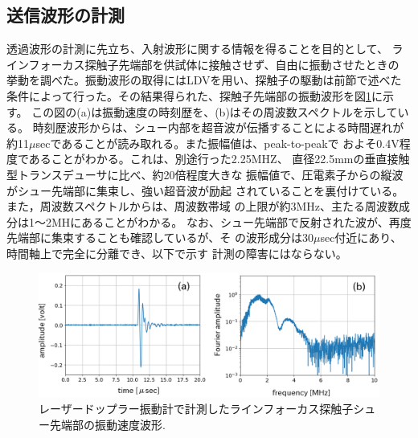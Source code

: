 \subsection{送信波形の計測}
透過波形の計測に先立ち、入射波形に関する情報を得ることを目的として、
ラインフォーカス探触子先端部を供試体に接触させず、自由に振動させたときの
挙動を調べた。振動波形の取得にはLDVを用い、探触子の駆動は前節で述べた
条件によって行った。その結果得られた、探触子先端部の振動波形を図\ref{fig:fig5}に示す。
この図の(a)は振動速度の時刻歴を、(b)はその周波数スペクトルを示している。
時刻歴波形からは、シュー内部を超音波が伝播することによる時間遅れが
約11$\mu$secであることが読み取れる。また振幅値は、peak-to-peakで
およそ0.4V程度であることがわかる。これは、別途行った2.25MHZ、
直径22.5mmの垂直接触型トランスデューサに比べ、約20倍程度大きな
振幅値で、圧電素子からの縦波がシュー先端部に集束し、強い超音波が励起
されていることを裏付けている。また，周波数スペクトルからは、周波数帯域
の上限が約3MHz、主たる周波数成分は1〜2MHにあることがわかる。
なお、シュー先端部で反射された波が、再度先端部に集束することも確認しているが、そ
の波形成分は30$\mu$sec付近にあり、時間軸上で完全に分離でき、以下で示す
計測の障害にはならない。
\begin{figure}[h]
	\begin{center}
	\includegraphics[width=0.9\linewidth]{Figs/fig5.eps} 
	\end{center}
	\caption{
		レーザードップラー振動計で計測したラインフォーカス探触子シュー先端部の振動速度波形.
	} 
	\label{fig:fig5}
\end{figure}
